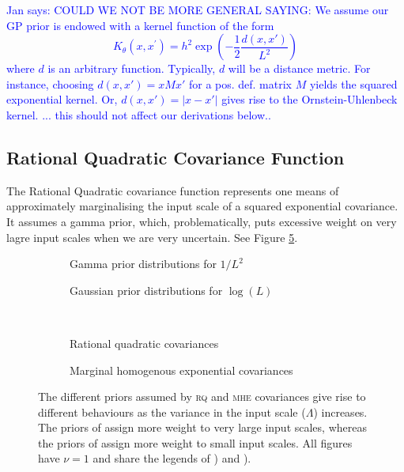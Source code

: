 \documentclass{article}
\newcommand\jansays[1]{\textcolor{blue}{Jan says: #1}}
\begin{document}
\jansays{ COULD WE NOT BE MORE GENERAL SAYING:  
We assume our GP prior is endowed with a kernel function of the form 
\begin{equation}
K_\theta(x,x^\prime) = h^2 \exp \left( -\frac{1}{2} \frac{d(x,x')}{L^2} \right)
\end{equation}
where $d$ is an arbitrary function. Typically, $d$ will be a distance metric. For instance, choosing $d(x,x') = x M x'$ for a pos. def. matrix $M$ yields the squared exponential kernel. Or, $d(x,x') = |x-x'|$ gives rise to the Ornstein-Uhlenbeck kernel.
... this should not affect our derivations below..}

\subsection{Rational Quadratic Covariance Function} 

The Rational Quadratic covariance function represents one means of approximately marginalising the input scale of a squared exponential covariance. It assumes a gamma prior, which, problematically, puts excessive weight on very lagre input scales when we are very uncertain. See Figure \ref{fig:rq_vs_our_cov}.

\begin{figure}
	\begin{subfigure}[b]{7cm}
		\caption{Gamma prior distributions for $1/L^2$}
		\label{fig:gamma_prior}
	\end{subfigure}
	\begin{subfigure}[b]{7cm}
		\caption{Gaussian prior distributions for $\log(L)$}
		 \label{fig:log_normal_prior}
	\end{subfigure}
 \\[0.2cm]
	\begin{subfigure}[b]{7cm}
		\caption{Rational quadratic covariances}
		\label{fig:RQ_cov}
	\end{subfigure}
	\begin{subfigure}[b]{7cm}
		\caption{Marginal homogenous exponential covariances}
		 \label{fig:our_cov}
	\end{subfigure}
\caption{The different priors assumed by {\scshape rq} and {\scshape mhe} covariances give rise to different behaviours as the variance in the input scale ($\Lambda$) increases. The priors of  assign more weight to very large input scales, whereas the priors of  assign more weight to small input scales. All figures have $\nu = 1$ and share the legends of ) and ).}
\label{fig:rq_vs_our_cov}
\end{figure}
\end{document}
